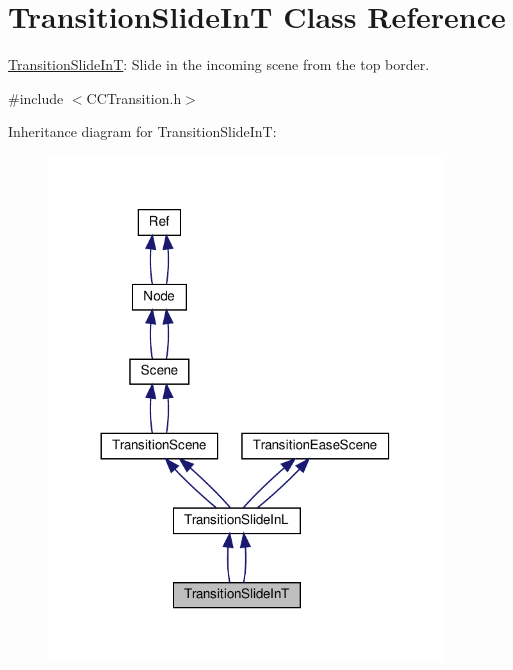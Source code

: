 \hypertarget{classTransitionSlideInT}{}\section{Transition\+Slide\+InT Class Reference}
\label{classTransitionSlideInT}


\hyperlink{classTransitionSlideInT}{Transition\+Slide\+InT}\+: Slide in the incoming scene from the top border.  




{\ttfamily \#include $<$C\+C\+Transition.\+h$>$}



Inheritance diagram for Transition\+Slide\+InT\+:
\nopagebreak
\begin{figure}[H]
\begin{center}
\leavevmode
\includegraphics[width=296pt]{classTransitionSlideInT__inherit__graph}
\end{center}
\end{figure}


